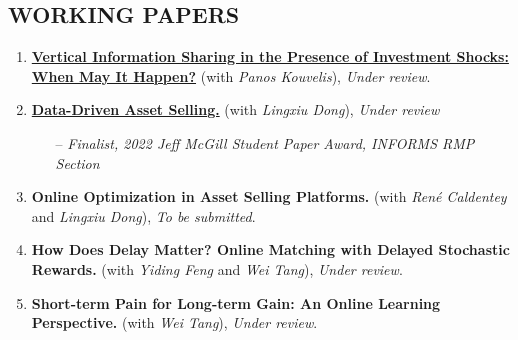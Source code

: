 \documentclass[margin]{res} %
\begin{document}
\begin{resume}
    \section{WORKING PAPERS}
    \begin{enumerate}[resume,leftmargin=*]
        \item \href{https://papers.ssrn.com/sol3/papers.cfm?abstract_id=3936170}{\textbf{Vertical Information Sharing in the Presence of Investment Shocks: When May It Happen?}} (with {\it Panos Kouvelis}), \textit{Under review}.
        \item \href{https://papers.ssrn.com/sol3/papers.cfm?abstract_id=4815339}{\textbf{Data-Driven Asset Selling.}} (with {\it Lingxiu Dong}), \textit{Under review}
            \begin{itemize}
                \item[--] {\it Finalist, 2022 Jeff McGill Student Paper Award, INFORMS RMP Section}
            \end{itemize}
        \item \textbf{Online Optimization in Asset Selling Platforms.} (with {\it Ren\'{e} Caldentey} and {\it Lingxiu Dong}), \textit{To be submitted}.
        \item \textbf{How Does Delay Matter? Online Matching with Delayed Stochastic Rewards.} (with {\it Yiding Feng} and {\it Wei Tang}), \textit{Under review}.
        \item \textbf{Short-term Pain for Long-term Gain: An Online Learning Perspective.} (with {\it Wei Tang}), \textit{Under review}.
    \end{enumerate}







\end{resume}
\end{document}
